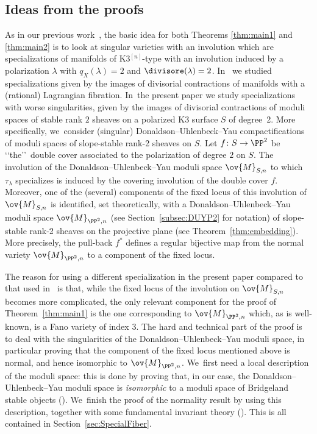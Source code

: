 \subsection{Ideas from the proofs}\label{subsec:IntroIdeaProof}

As in our previous work~\cite{involutions1}, the basic idea for both Theorems \ref{thm:main1} and \ref{thm:main2} is to look at singular \HK varieties with an involution which are specializations of \HK manifolds of K3$^{[n]}$-type with an involution induced by a polarization $\lambda$ with $q_X(\lambda)=2$ and $\divisore(\lambda)=2$.
In~\cite{involutions1} we studied specializations given by the images of divisorial contractions of \HK manifolds with a (rational) Lagrangian fibration. In~the present paper we study specializations with worse singularities, given by the images of divisorial contractions of moduli spaces of stable rank $2$ sheaves on a polarized K3 surface $S$ of degree~2.
More specifically, we~consider (singular) Donaldson--Uhlenbeck--Yau compactifications of moduli spaces of slope-stable rank-2 sheaves on $S$. Let $f\colon S\to \PP^2$ be \lq\lq the\rq\rq\ double cover associated to the polarization of degree $2$ on $S$.
The involution of the Donaldson--Uhlenbeck--Yau moduli space $\ov{M}_{S,n}$ to which $\tau_\lambda$ specializes is induced by the covering involution of the double cover $f$.
Moreover, one of the (several) components of the fixed locus of this involution of $\ov{M}_{S,n}$ is identified, set theoretically, with a Donaldson--Uhlenbeck--Yau moduli space $\ov{M}_{\PP^2,n}$ (see Section~\ref{subsec:DUYP2} for notation) of slope-stable rank-2 sheaves on the projective plane (see Theorem~\ref{thm:embedding}).
More precisely, the pull-back $f^{*}$ defines a regular bijective map from the normal variety $\ov{M}_{\PP^2,n}$ to a component of the fixed locus.

The reason for using a different specialization in the present paper compared to that used in~\cite{involutions1} is that, while the fixed locus of the involution on $\ov{M}_{S,n}$ becomes more complicated, the only relevant component for the proof of Theorem~\ref{thm:main1} is the one corresponding to $\ov{M}_{\PP^2,n}$ which, as is well-known, is a Fano variety of index $3$.
The hard and technical part of the proof is to deal with the singularities of the Donaldson--Uhlenbeck--Yau moduli space, in particular proving that the component of the fixed locus mentioned above is normal, and hence isomorphic to $\ov{M}_{\PP^2,n}$. We~first need a local description of the moduli space: this is done by proving that, in our case, the Donaldson--Uhlenbeck--Yau moduli space is \emph{isomorphic} to a moduli space of Bridgeland stable objects (\cite{Bridgeland:Stab,Tajakka:Uhlenbeck}). We~finish the proof of the normality result by using this description, together with some fundamental invariant theory (\cite{procesi:invariants}).
This is all contained in Section~\ref{sec:SpecialFiber}.

